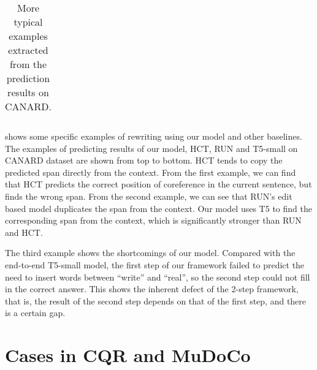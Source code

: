 \begin{table}[th]
{\begin{tabular}{cl}
\bottomrule
\end{tabular}}
\caption{More typical examples extracted from the prediction results on CANARD.}
\label{tab:case-study}
\end{table}

 shows some specific examples
of rewriting using our model and other baselines.
The examples of predicting results of our model, HCT, RUN and T5-small on CANARD dataset are shown from top to bottom. 
HCT tends to copy the predicted span directly from the context. From the first example, we can find that HCT predicts the correct position of coreference in the current sentence, but finds the wrong span. From the second example, we can see that RUN's edit based model duplicates the span from the context.  Our model uses T5 to find the corresponding span from the context, which is significantly stronger than RUN and HCT.



The third example shows the shortcomings of our model. Compared with the end-to-end T5-small model, the first step of our framework failed to predict the need to insert words between ``write'' and ``real'', so the second step could not fill in the correct answer. This shows the inherent defect of the 2-step framework, that is, the result of the second step depends on that of the first step, and there is a certain gap.


\section{Cases in CQR and MuDoCo}

